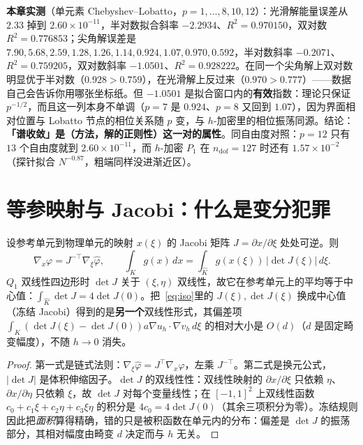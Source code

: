 \textbf{本章实测}（单元素 Chebyshev--Lobatto，$p=1,\dots,8,10,12$）：光滑解能量误差从 $2.33$ 掉到
$2.60\times10^{-11}$，半对数拟合斜率 $-2.2934$、$R^2=0.970150$，双对数 $R^2=0.776853$；尖角解误差是
$7.90,5.68,2.59,1.28,1.26,1.14,0.924,1.07,0.970,0.592$，半对数斜率 $-0.2071$、$R^2=0.759205$，双对数斜率
$-1.0501$、$R^2=0.928222$。在同一个尖角解上双对数明显优于半对数（$0.928>0.759$），在光滑解上反过来（$0.970>0.777$）——数据自己会告诉你用哪张坐标纸。但
$-1.0501$ 是拟合窗口内的\textbf{有效}指数：理论只保证 $p^{-1/2}$，而且这一列本身不单调（$p=7$ 是 $0.924$、$p=8$ 又回到
$1.07$），因为界面相对位置与 Lobatto 节点的相位关系随 $p$ 变，与
$h$-加密里的相位振荡同源。结论：\textbf{「谱收敛」是（方法，解的正则性）这一对的属性}。同自由度对照：$p=12$ 只有 $13$ 个自由度就到
$2.60\times10^{-11}$，而 $h$-加密 $P_1$ 在 $n_{\text{dof}}=127$ 时还有 $1.57\times10^{-2}$（探针拟合
$N^{-0.87}$，粗端同样没进渐近区）。

\section{等参映射与 Jacobi：什么是变分犯罪}

\begin{theorem}
\label{thm:iso}
设参考单元到物理单元的映射 $x(\xi)$ 的 Jacobi 矩阵 $J=\partial x/\partial\xi$ 处处可逆。则
\begin{equation}
  \nabla_x\varphi=J^{-\top}\nabla_\xi\hat\varphi,\qquad
  \int_Kg(x)\,dx=\int_{\hat K}g(x(\xi))\,|\det J(\xi)|\,d\xi .
  \label{eq:iso}
\end{equation}
$Q_1$ 双线性四边形时 $\det J$ 关于 $(\xi,\eta)$ 双线性，故它在参考单元上的平均等于中心值：$\int_{\hat K}\det J=4\det
J(0)$。把~\eqref{eq:iso}里的 $J(\xi),\det J(\xi)$ 换成中心值（冻结 Jacobi）得到的是\textbf{另一个}双线性形式，其偏差项
$\int_K(\det J(\xi)-\det J(0))a\nabla u_h\cdot\nabla v_h\,d\xi$ 的相对大小是 $O(d)$（$d$ 是固定畸变幅度），不随
$h\to0$ 消失。
\end{theorem}
\begin{proof}
第一式是链式法则：$\nabla_\xi\hat\varphi=J^{\top}\nabla_x\varphi$，左乘 $J^{-\top}$。第二式是换元公式，$|\det J|$
是体积伸缩因子。$\det J$ 的双线性性：双线性映射的 $\partial x/\partial\xi$ 只依赖 $\eta$、$\partial x/\partial\eta$ 只依赖
$\xi$，故 $\det J$ 对每个变量线性；在 $[-1,1]^2$ 上双线性函数 $c_0+c_1\xi+c_2\eta+c_3\xi\eta$ 的积分是 $4c_0=4\det
J(0)$（其余三项积分为零）。冻结规则因此把\emph{面积}算得精确，错的只是被积函数在单元内的分布：偏差是 $\det J$ 的振荡部分，其相对幅度由畸变 $d$ 决定而与 $h$
无关。
\end{proof}

